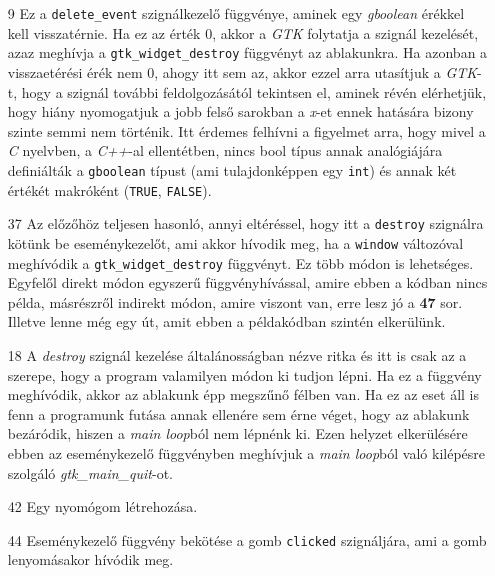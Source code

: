\documentclass[a4paper,10pt]{article}
\begin{document}
\begin{enumerate}
 \item[9] Ez a \texttt{delete\_event} szignálkezelő függvénye, aminek egy \textit{gboolean} érékkel kell visszatérnie. Ha ez az érték 0, akkor a \textit{GTK} folytatja a szignál kezelését, azaz meghívja a \texttt{gtk\_widget\_destroy} függvényt az ablakunkra. Ha azonban a visszaetérési érék nem 0, ahogy itt sem az, akkor ezzel arra utasítjuk a \textit{GTK}-t, hogy a szignál további feldolgozásától tekintsen el, aminek révén elérhetjük, hogy hiány nyomogatjuk a jobb felső sarokban a \textit{x}-et ennek hatására bizony szinte semmi nem történik. Itt érdemes felhívni a figyelmet arra, hogy mivel a \textit{C} nyelvben, a \textit{C++}-al ellentétben, nincs bool típus annak analógiájára definiálták a \texttt{gboolean} típust (ami tulajdonképpen egy \texttt{int}) és annak két értékét makróként (\texttt{TRUE}, \texttt{FALSE}).

 \item[37] Az előzőhöz teljesen hasonló, annyi eltéréssel, hogy itt a \texttt{destroy} szignálra kötünk be eseménykezelőt, ami akkor hívodik meg, ha a \texttt{window} változóval meghívódik a \texttt{gtk\_widget\_destroy} függvényt. Ez több módon is lehetséges. Egyfelől direkt módon egyszerű függvényhívással, amire ebben a kódban nincs példa, másrészről indirekt módon, amire viszont van, erre lesz jó a \textbf{47} sor. Illetve lenne még egy út, amit ebben a példakódban szintén elkerülünk.

 \item[18] A \textit{destroy} szignál kezelése általánosságban nézve ritka és itt is csak az a szerepe, hogy a program valamilyen módon ki tudjon lépni. Ha ez a függvény meghívódik, akkor az ablakunk épp megszűnő félben van. Ha ez az eset áll is fenn a programunk futása annak ellenére sem érne véget, hogy az ablakunk bezáródik, hiszen a \textit{main loop}ból nem lépnénk ki. Ezen helyzet elkerülésére ebben az eseménykezelő függvényben meghívjuk a \textit{main loop}ból való kilépésre szolgáló \textit{gtk\_main\_quit}-ot.

 \item[42] Egy nyomógom létrehozása.

 \item[44] Eseménykezelő függvény bekötése a gomb \texttt{clicked} szignáljára, ami a gomb lenyomásakor hívódik meg.


\end{enumerate}
\end{document}
